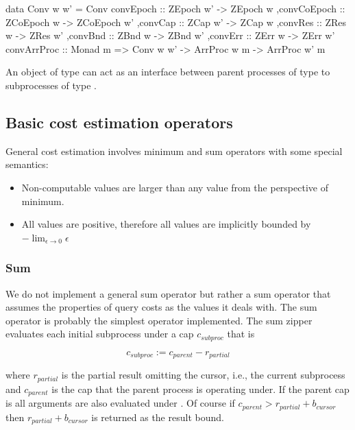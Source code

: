 \begin{code}
\begin{haskellcode}
data Conv w w' =
  Conv
  { convEpoch :: ZEpoch w' -> ZEpoch w
   ,convCoEpoch :: ZCoEpoch w -> ZCoEpoch w'
   ,convCap :: ZCap w' -> ZCap w
   ,convRes :: ZRes w -> ZRes w'
   ,convBnd :: ZBnd w -> ZBnd w'
   ,convErr :: ZErr w -> ZErr w'
  }
convArrProc :: Monad m => Conv w w' -> ArrProc w m -> ArrProc w' m
\end{haskellcode}
  \caption{\label{lst:conv_def}An object of type  can
    act as an interface between parent processes of type  to
    subprocesses of type .}
\end{code}

\subsection{Basic cost estimation operators}
\label{sec:basic_cost_ops}

General cost estimation involves minimum and sum operators with some
special semantics:

\begin{itemize}
\item Non-computable values are larger than any value from the
  perspective of minimum.
\item All values are positive, therefore all values are implicitly
  bounded by \(- \lim_{\epsilon \to 0} \epsilon\)
\end{itemize}

\subsubsection{Sum}

We do not implement a general sum operator but rather a sum operator
that assumes the properties of query costs as the values it deals
with. The sum operator is probably the simplest operator
implemented. The sum zipper evaluates each initial subprocess under a
cap \(c_{subproc}\) that is

\[
c_{subproc} := c_{parent} - r_{partial}
\]

where \(r_{partial}\) is the partial result omitting the cursor, i.e.,
the current subprocess and \(c_{parent}\) is the cap that the parent
process is operating under. If the parent cap is  all
arguments are also evaluated under . Of course if
\(c_{parent} > r_{partial} + b_{cursor}\) then \(r_{partial} +
b_{cursor}\) is returned as the result bound.

